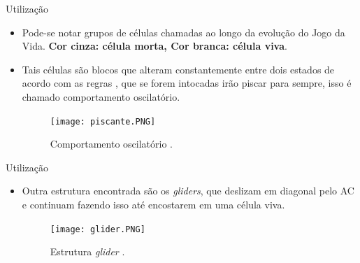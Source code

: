 \documentclass[compress, hide notes]{beamer}
\begin{document}
\begin{frame}{Utilização}
	
	\begin{itemize}
	
		\item Pode-se notar grupos de células chamadas  ao longo da evolução do Jogo da Vida. \textbf{Cor cinza: célula morta, Cor branca: célula viva}.
		
		\bigskip
		
		\item Tais células são blocos que alteram constantemente entre dois estados de acordo com as regras , que se forem intocadas irão piscar para sempre, isso é chamado comportamento oscilatório.
		
		\begin{figure}[h]
										
			\center
															
			\texttt{[image: piscante.PNG]}
			\caption{Comportamento oscilatório \cite{ufmg}.}
									
		\end{figure}
		
	\end{itemize}
	
\end{frame}

\begin{frame}{Utilização}
	
	\begin{itemize}
	
		\item Outra estrutura encontrada são os \textit{gliders}, que deslizam em diagonal pelo AC e continuam fazendo isso até encostarem em uma célula viva.
				
		\begin{figure}[h]
										
			\center
															
			\texttt{[image: glider.PNG]}
			\caption{Estrutura \textit{glider} \cite{ufmg}.}
									
		\end{figure}
		
	\end{itemize}
	
\end{frame}
\end{document}
